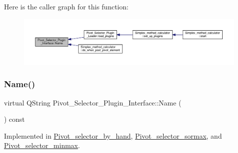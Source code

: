 Here is the caller graph for this function\+:\nopagebreak
\begin{figure}[H]
\begin{center}
\leavevmode
\includegraphics[width=350pt]{classPivot__Selector__Plugin__Interface_a35b4215e27a169edc2260f2e578de184_icgraph}
\end{center}
\end{figure}
\mbox{\label{classPivot__Selector__Plugin__Interface_a35b4215e27a169edc2260f2e578de184}} 
\subsubsection{\texorpdfstring{Name()}{Name()}\hspace{0.1cm}{\footnotesize\ttfamily [3/4]}}
{\footnotesize\ttfamily virtual Q\+String Pivot\+\_\+\+Selector\+\_\+\+Plugin\+\_\+\+Interface\+::\+Name (\begin{DoxyParamCaption}{ }\end{DoxyParamCaption}) const\hspace{0.3cm}{\ttfamily [pure virtual]}}



Implemented in \hyperlink{classPivot__selector__by__hand_adb03a4ea722819c478e5fd71e5e6f364}{Pivot\+\_\+selector\+\_\+by\+\_\+hand}, \hyperlink{classPivot__selector__sormax_a72875b6810a0f83c77ff2abde1b186a4}{Pivot\+\_\+selector\+\_\+sormax}, and \hyperlink{classPivot__selector__minmax_a9df8c5a5f3a0cf1f9c97ee8d8ad68b1b}{Pivot\+\_\+selector\+\_\+minmax}.

\mbox{\label{classPivot__Selector__Plugin__Interface_a35b4215e27a169edc2260f2e578de184}} 
